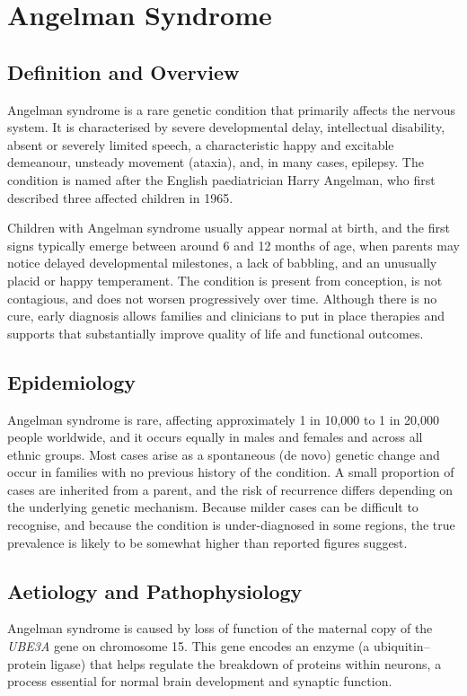 \chapter{Angelman Syndrome}

\section*{Definition and Overview}
Angelman syndrome is a rare genetic condition that primarily affects the nervous system. It is characterised by severe developmental delay, intellectual disability, absent or severely limited speech, a characteristic happy and excitable demeanour, unsteady movement (ataxia), and, in many cases, epilepsy. The condition is named after the English paediatrician Harry Angelman, who first described three affected children in 1965.

Children with Angelman syndrome usually appear normal at birth, and the first signs typically emerge between around 6 and 12 months of age, when parents may notice delayed developmental milestones, a lack of babbling, and an unusually placid or happy temperament. The condition is present from conception, is not contagious, and does not worsen progressively over time. Although there is no cure, early diagnosis allows families and clinicians to put in place therapies and supports that substantially improve quality of life and functional outcomes.

\section*{Epidemiology}
Angelman syndrome is rare, affecting approximately 1 in 10,000 to 1 in 20,000 people worldwide, and it occurs equally in males and females and across all ethnic groups. Most cases arise as a spontaneous (de novo) genetic change and occur in families with no previous history of the condition. A small proportion of cases are inherited from a parent, and the risk of recurrence differs depending on the underlying genetic mechanism. Because milder cases can be difficult to recognise, and because the condition is under-diagnosed in some regions, the true prevalence is likely to be somewhat higher than reported figures suggest.

\section*{Aetiology and Pathophysiology}
Angelman syndrome is caused by loss of function of the maternal copy of the \textit{UBE3A} gene on chromosome 15. This gene encodes an enzyme (a ubiquitin--protein ligase) that helps regulate the breakdown of proteins within neurons, a process essential for normal brain development and synaptic function.

